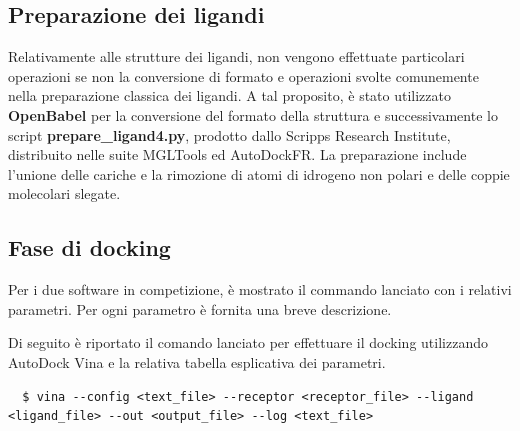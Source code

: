 \subsection{Preparazione dei ligandi}
Relativamente alle strutture dei ligandi, non vengono effettuate particolari operazioni se non la conversione di formato e operazioni svolte comunemente nella preparazione classica dei ligandi. 
A tal proposito, è stato utilizzato \textbf{OpenBabel} per la conversione del formato della struttura e successivamente lo script \textbf{prepare\_ligand4.py}, prodotto dallo Scripps Research Institute, distribuito nelle suite MGLTools ed AutoDockFR.
La preparazione include l'unione delle cariche e la rimozione di atomi di idrogeno non polari e delle coppie molecolari slegate.


\subsection{Fase di docking}
Per i due software in competizione, è mostrato il commando lanciato con i relativi parametri. Per ogni parametro è fornita una breve descrizione.

Di seguito è riportato il comando lanciato per effettuare il docking utilizzando AutoDock Vina e la relativa tabella esplicativa dei parametri.

\begin{verbatim}
  $ vina --config <text_file> --receptor <receptor_file> --ligand <ligand_file> --out <output_file> --log <text_file>
\end{verbatim}
%

